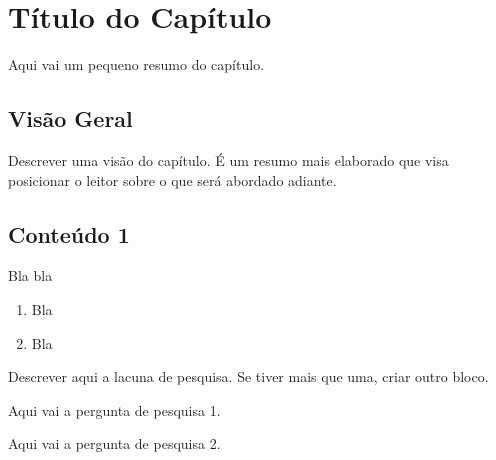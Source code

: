 \chapter{Título do Capítulo}
\label{ch:identificador}
	\begin{resumocapitulo}
		Aqui vai um pequeno resumo do capítulo.
	\end{resumocapitulo}

	\section{Visão Geral}
		Descrever uma visão do capítulo. É um resumo mais elaborado que visa posicionar o leitor sobre o que será abordado adiante.

	\section{Conteúdo 1}
	\label{sec:identificao}
        Bla bla

		\begin{enumerate}
			\item Bla
			\item Bla
		\end{enumerate}

		\begin{lacuna}
		\label{lacuna:lacuna1}
			Descrever aqui a lacuna de pesquisa. Se tiver mais que uma, criar outro bloco.
		\end{lacuna}
	
		\begin{pergunta}
		\label{pergunta:pergunta_1}
			Aqui vai a pergunta de pesquisa 1.
		\end{pergunta}

		\begin{pergunta}
		\label{pergunta:pergunta_2}
			Aqui vai a pergunta de pesquisa 2.
		\end{pergunta}	